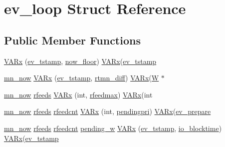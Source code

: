 \hypertarget{structev__loop}{\section{ev\-\_\-loop \-Struct \-Reference}
\label{structev__loop}
}
\subsection*{\-Public \-Member \-Functions}
\begin{DoxyCompactItemize}
\item 
\hyperlink{structev__loop_a1d7ebd768a98eb8a14a1576ef3312cd4}{\-V\-A\-Rx} (\hyperlink{ev_8h_add71e34ce2b04bbf7eb6f31a850814e8}{ev\-\_\-tstamp}, \hyperlink{ev__wrap_8h_aa4bff23174631181701c9a1e29bde184}{now\-\_\-floor}) \hyperlink{structev__loop_ab4710db67bbb58f2502416b96745b404}{\-V\-A\-Rx}(\hyperlink{ev_8h_add71e34ce2b04bbf7eb6f31a850814e8}{ev\-\_\-tstamp}
\item 
\hyperlink{ev__wrap_8h_a13d32fd5b8e9174e15dc882c00cd8b56}{mn\-\_\-now} \hyperlink{structev__loop_a1f599397e40ec502dd72782230eae2b5}{\-V\-A\-Rx} (\hyperlink{ev_8h_add71e34ce2b04bbf7eb6f31a850814e8}{ev\-\_\-tstamp}, \hyperlink{ev__wrap_8h_aa574a8b51956c152cc7926ad6b39d828}{rtmn\-\_\-diff}) \hyperlink{structev__loop_ab4710db67bbb58f2502416b96745b404}{\-V\-A\-Rx}(\hyperlink{ev_8c_a1d5a98f4500d54b812947ada8c7d517f}{\-W} $\ast$
\item 
\hyperlink{ev__wrap_8h_a13d32fd5b8e9174e15dc882c00cd8b56}{mn\-\_\-now} \hyperlink{ev__wrap_8h_acc5033089a37bb992d8c3e8eaae46e2e}{rfeeds} \hyperlink{structev__loop_adedb82454f3e68e6bb6f5b3eaaf128fe}{\-V\-A\-Rx} (int, \hyperlink{ev__wrap_8h_a3b48ac30127da85b9f4c0b921eca15bc}{rfeedmax}) \hyperlink{structev__loop_ab4710db67bbb58f2502416b96745b404}{\-V\-A\-Rx}(int
\item 
\hyperlink{ev__wrap_8h_a13d32fd5b8e9174e15dc882c00cd8b56}{mn\-\_\-now} \hyperlink{ev__wrap_8h_acc5033089a37bb992d8c3e8eaae46e2e}{rfeeds} \hyperlink{ev__wrap_8h_a1b4898488eed271e73387b6fb447afa8}{rfeedcnt} \hyperlink{structev__loop_ac5272fbdea7cf951bb16a9531fb8dc66}{\-V\-A\-Rx} (int, \hyperlink{ev__wrap_8h_af2a84d42c15af786e245e848e194685e}{pendingpri}) \hyperlink{structev__loop_ab4710db67bbb58f2502416b96745b404}{\-V\-A\-Rx}(\hyperlink{structev__prepare}{ev\-\_\-prepare}
\item 
\hyperlink{ev__wrap_8h_a13d32fd5b8e9174e15dc882c00cd8b56}{mn\-\_\-now} \hyperlink{ev__wrap_8h_acc5033089a37bb992d8c3e8eaae46e2e}{rfeeds} \hyperlink{ev__wrap_8h_a1b4898488eed271e73387b6fb447afa8}{rfeedcnt} \hyperlink{ev__wrap_8h_a2df31e042905049ce69a85286ce86683}{pending\-\_\-w} \hyperlink{structev__loop_a76f29853a6dd1c9d2942713108750462}{\-V\-A\-Rx} (\hyperlink{ev_8h_add71e34ce2b04bbf7eb6f31a850814e8}{ev\-\_\-tstamp}, \hyperlink{ev__wrap_8h_a20ec4d26419f97ae2af673adeecc804c}{io\-\_\-blocktime}) \hyperlink{structev__loop_ab4710db67bbb58f2502416b96745b404}{\-V\-A\-Rx}(\hyperlink{ev_8h_add71e34ce2b04bbf7eb6f31a850814e8}{ev\-\_\-tstamp}

\end{DoxyCompactItemize}
